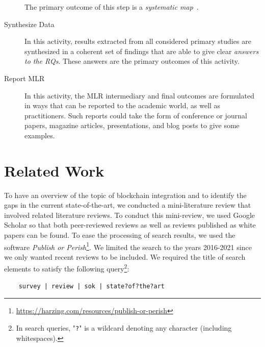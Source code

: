 \documentclass[review]{elsarticle}
\begin{document}
\begin{description}
	The primary outcome of this step is a \emph{systematic map}~\cite{Kitchenham2007SLR}.
	\item[Synthesize Data] In this activity, results extracted from all considered primary studies are synthesized in a coherent set of findings that are able to give clear \emph{answers to the RQs}.
	These answers are the primary outcomes of this activity.
	\item[Report MLR] In this activity, the MLR intermediary and final outcomes are formulated in ways that can be reported to the academic world, as well as practitioners.
	Such reports could take the form of conference or journal papers, magazine articles, presentations, and blog posts to give some examples.
\end{description}


\section{Related Work}
\label{sec:related-work}

To have an overview of the topic of blockchain integration and to identify the gaps in the current state-of-the-art, we conducted a mini-literature review that involved related literature reviews.
To conduct this mini-review, we used Google Scholar so that both peer-reviewed reviews as well as reviews published as white papers can be found.
To ease the processing of search results, we used the software \textit{Publish or Perish}\footnote{\url{https://harzing.com/resources/publish-or-perish}}.
We limited the search to the years 2016-2021 since we only wanted recent reviews to be included.
We required the title of search elements to satisfy the following query\footnote{In search queries, "\texttt{?}" is a wildcard denoting any character (including whitespaces).}:
\begin{lstlisting}
	survey | review | sok | state?of?the?art
\end{lstlisting}
\end{document}
